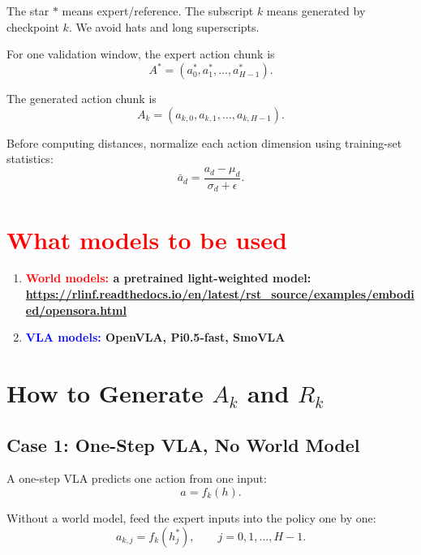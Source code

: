 \documentclass[11pt]{article}
\begin{document}
The star $*$ means expert/reference.
The subscript $k$ means generated by checkpoint $k$.
We avoid hats and long superscripts.

For one validation window, the expert action chunk is
\begin{equation}
A^*=(a^*_0,a^*_1,\ldots,a^*_{H-1}).
\end{equation}

The generated action chunk is
\begin{equation}
A_k=(a_{k,0},a_{k,1},\ldots,a_{k,H-1}).
\end{equation}

Before computing distances, normalize each action dimension using training-set statistics:
\begin{equation}
\bar a_d = \frac{a_d-\mu_d}{\sigma_d+\epsilon}.
\end{equation}



\section{\textcolor{red}{What models to be used}}

\begin{enumerate}
    \item  \textbf{\textcolor{red}{World models:} a pretrained light-weighted model: \url{https://rlinf.readthedocs.io/en/latest/rst_source/examples/embodied/opensora.html}}


    \item \textbf{\textcolor{blue}{VLA models:} OpenVLA, Pi0.5-fast, SmoVLA}
\end{enumerate}


\section{How to Generate $A_k$ and $R_k$}

\subsection{Case 1: One-Step VLA, No World Model}

A one-step VLA predicts one action from one input:
\begin{equation}
a=f_k(h).
\end{equation}

Without a world model, feed the expert inputs into the policy one by one:
\begin{equation}
a_{k,j}=f_k(h^*_j),
\qquad j=0,1,\ldots,H-1.
\end{equation}
\end{document}
